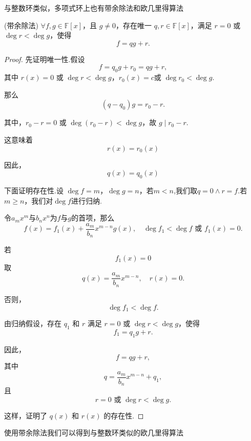 与整数环类似，多项式环上也有带余除法和欧几里得算法
\begin{proposition}(带余除法)\label{带余除法}
	 \( \forall f, g \in \mathbb{F}[x] \)，且 \( g \neq 0 \)，存在唯一 \( q, r \in \mathbb{F}[x] \)，满足 \( r = 0 \) 或 \( \deg r < \deg g \)，使得
	\[ f = qg + r. \]
	
	
\end{proposition}
\begin{proof}
	先证明唯一性.假设
	\[ f = q_0 g + r_0=qg + r, \]
	其中 \( r(x) = 0 \) 或 \( \deg r < \deg g \)，\( r_0(x) = c \)或 \( \deg r_0 < \deg g \).
	
	那么
	\[ (q - q_0)g = r_0 - r. \]
	
	其中，\( r_0 - r = 0 \) 或 \( \deg(r_0 - r) < \deg g \)，故 \( g \mid r_0 - r \).
	
	这意味着
	\[ r(x) = r_0(x) \]
	
	因此，
	\[ q(x) = q_0(x)\]
	
	下面证明存在性.设 \( \deg f = m \)，\( \deg g = n \)，若$m<n$,我们取$q=0\wedge r=f$.若 \( m \geq n \)，我们对$\deg f$进行归纳.
	
	令$a_m x^m$与$b_nx^n$为$f$与$g$的首项，那么
	\[ f(x) = f_1(x) +\frac{a_m}{b_n} x^{m-n} g(x), \quad \deg f_1 < \deg f \text{ 或 } f_1(x) = 0. \]
	
	若
	\[ f_1(x) = 0\]
	取
	\[ q(x) = \frac{a_m}{b_n} x^{m-n}, \quad r(x) = 0. \]
	
	否则，
	\[ \deg f_1 < \deg f. \]
	
	由归纳假设，存在 \( q_1 \) 和 \( r \) 满足 \( r = 0 \) 或 \( \deg r < \deg g \)，使得
	\[ f_1 = q_1 g + r. \]
	
	因此，
	\[ f = qg + r, \]
	其中
	\[ q = \frac{a_m}{b_n} x^{m-n} + q_1, \]
	且
	\[ r = 0 \text{ 或 } \deg r < \deg g. \]
	
	这样，证明了 \( q(x) \) 和 \( r(x) \) 的存在性.
	
\end{proof}

使用带余除法我们可以得到与整数环类似的欧几里得算法

